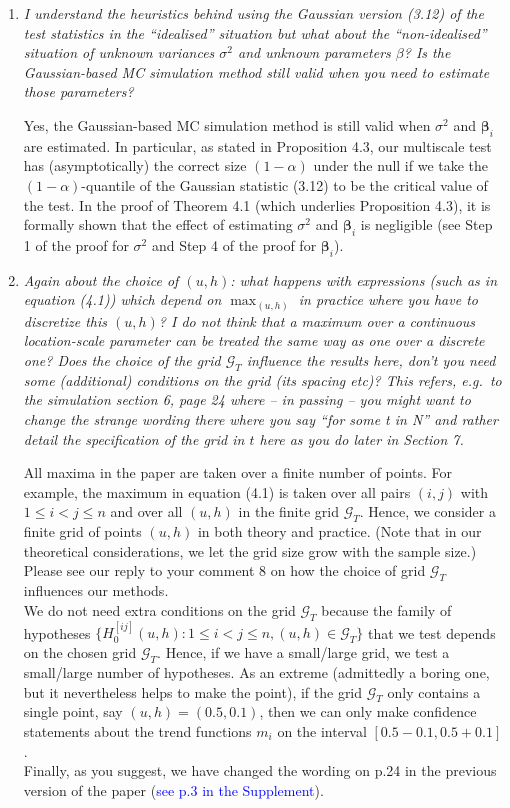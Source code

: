 \documentclass[a4paper,12pt]{article}
\begin{document}
\begin{enumerate}[label=\arabic*.,leftmargin=0.6cm]
\item \textit{I understand the heuristics behind using the Gaussian version (3.12) of the test statistics in the ``idealised'' situation but what about the ``non-idealised'' situation of unknown variances $\sigma^ 2$ and unknown parameters $\beta$? Is the Gaussian-based MC simulation method still valid when you need to estimate those parameters?}  

Yes, the Gaussian-based MC simulation method is still valid when $\sigma^2$ and $\boldsymbol{\beta}_i$ are estimated. In particular, as stated in Proposition 4.3, our multiscale test has (asymptotically) the correct size $(1-\alpha)$ under the null if we take the $(1-\alpha)$-quantile of the Gaussian statistic (3.12) to be the critical value of the test. In the proof of Theorem 4.1 (which underlies Proposition 4.3), it is formally shown that the effect of estimating $\sigma^2$ and $\boldsymbol{\beta}_i$ is negligible (see Step 1 of the proof for $\sigma^2$ and Step 4 of the proof for $\boldsymbol{\beta}_i$).
  

\item \textit{Again about the choice of $(u, h)$: what happens with expressions (such as in equation (4.1)) which depend on $\max_{(u,h)}$ in practice where you have to discretize this $(u, h)$? I do not think that a maximum over a continuous location-scale parameter can be treated the same way as one over a discrete one? Does the choice of the grid $\mathcal{G}_T$ influence the results here, don't you need some (additional) conditions on the grid (its spacing etc)? This refers, e.g.\ to the simulation section 6, page 24 where -- in passing -- you might want to change the strange wording there where you say ``for some t in N'' and rather detail the specification of the grid in $t$ here as you do later in Section 7.}  

All maxima in the paper are taken over a finite number of points. For example, the maximum in equation (4.1) is taken over all pairs $(i,j)$ with $1 \le i < j \le n$ and over all $(u,h)$ in the finite grid $\mathcal{G}_T$. Hence, we consider a finite grid of points $(u,h)$ in both theory and practice. (Note that in our theoretical considerations, we let the grid size grow with the sample size.) \\
Please see our reply to your comment 8 on how the choice of grid $\mathcal{G}_T$ influences our methods. \\
We do not need extra conditions on the grid $\mathcal{G}_T$ because the family of hypotheses $\{H_0^{[ij]}(u,h): 1 \le i < j \le n, (u,h) \in \mathcal{G}_T \}$ that we test depends on the chosen grid $\mathcal{G}_T$. Hence, if we have a small/large grid, we test a small/large number of hypotheses. As an extreme (admittedly a boring one, but it nevertheless helps to make the point), if the grid $\mathcal{G}_T$ only contains a single point, say $(u,h) = (0.5, 0.1)$, then we can only make confidence statements about the trend functions $m_i$ on the interval $[0.5-0.1,0.5+0.1]$. \\
Finally, as you suggest, we have changed the wording on p.24 in the previous version of the paper (\textcolor{blue}{see p.3 in the Supplement}). 



\end{enumerate}
\end{document}
